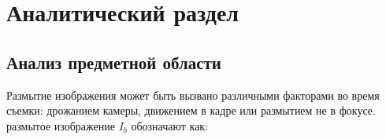 \chapter{Аналитический раздел}


% 
% 

\section{Анализ предметной области}





Размытие изображения может быть вызвано различными факторами во время съемки: дрожанием камеры, движением в кадре или размытием не в фокусе. размытое изображение \(I_{b}\) обозначают как:

